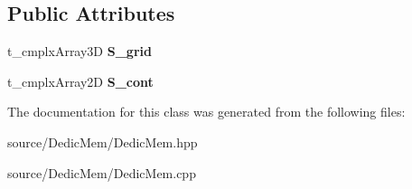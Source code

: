 \subsection*{Public Attributes}
\begin{DoxyCompactItemize}
\item 
\hypertarget{class_c___dedic_mem___quark_abb615a8d4eb2c5844634ac810197ad61}{t\-\_\-cmplx\-Array3\-D {\bfseries S\-\_\-grid}}\label{class_c___dedic_mem___quark_abb615a8d4eb2c5844634ac810197ad61}

\item 
\hypertarget{class_c___dedic_mem___quark_a211eb01b6fb3e276987b2a99899d18b6}{t\-\_\-cmplx\-Array2\-D {\bfseries S\-\_\-cont}}\label{class_c___dedic_mem___quark_a211eb01b6fb3e276987b2a99899d18b6}

\end{DoxyCompactItemize}


The documentation for this class was generated from the following files\-:\begin{DoxyCompactItemize}
\item 
source/\-Dedic\-Mem/Dedic\-Mem.\-hpp\item 
source/\-Dedic\-Mem/Dedic\-Mem.\-cpp\end{DoxyCompactItemize}
